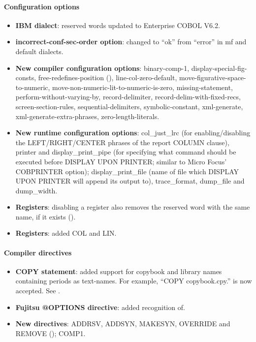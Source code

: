 \paragraph{Configuration options}
\begin{itemize}
\item \textbf{IBM dialect}: reserved words updated to Enterprise COBOL V6.2.
\item \textbf{incorrect-conf-sec-order option}: changed to ``ok'' from ``error'' in mf and default dialects.
\item \textbf{New compiler configuration options}: binary-comp-1, display-special-fig-consts, free-redefines-position (), line-col-zero-default, move-figurative-space-to-numeric, move-non-numeric-lit-to-numeric-is-zero, missing-statement, perform-without-varying-by, record-delimiter, record-delim-with-fixed-recs, screen-section-rules, sequential-delimiters, symbolic-constant, xml-generate, xml-generate-extra-phrases, zero-length-literals.
\item \textbf{New runtime configuration options}: col\_just\_lrc (for enabling\slash{}disabling the LEFT\slash{}RIGHT\slash{}CENTER phrases of the report COLUMN clause), printer and display\_print\_pipe (for specifying what command should be executed before DISPLAY UPON PRINTER; similar to Micro Focus' COBPRINTER option); display\_print\_file (name of file which DISPLAY UPON PRINTER will append its output to), trace\_format, dump\_file and dump\_width.
\item \textbf{Registers}: disabling a register also removes the reserved word with the same name, if it exists ().
\item \textbf{Registers}: added COL and LIN.
\end{itemize}

\paragraph{Compiler directives}
\begin{itemize}
\item \textbf{COPY statement}: added support for copybook and library names containing periods as text-names. For example,  ``COPY copybook.cpy.'' is now accepted. See .
\item \textbf{Fujitsu @OPTIONS directive}: added recognition of.
\item \textbf{New directives}: ADDRSV, ADDSYN, MAKESYN, OVERRIDE and REMOVE (); COMP1.
\end{itemize}


